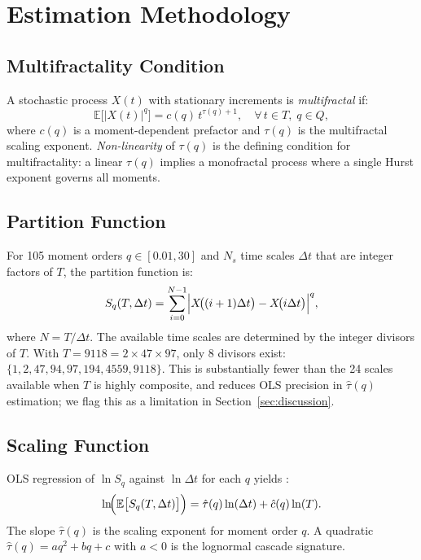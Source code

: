 \documentclass[12pt,a4paper]{article}
\begin{document}
\section{Estimation Methodology}

\subsection{Multifractality Condition}

A stochastic process $X(t)$ with stationary increments is
\emph{multifractal} if:
\begin{equation}
  \mathbb{E}\bigl[|X(t)|^q\bigr] = c(q)\,t^{\tau(q)+1},
  \quad \forall\, t \in T,\; q \in Q,
  \label{eq:multifractal-def}
\end{equation}
where $c(q)$ is a moment-dependent prefactor and $\tau(q)$ is the
multifractal scaling exponent. \emph{Non-linearity} of $\tau(q)$ is
the defining condition for multifractality: a linear $\tau(q)$ implies
a monofractal process where a single Hurst exponent governs all moments.

\subsection{Partition Function}

For 105 moment orders $q \in [0.01, 30]$ and $N_s$ time scales
$\Delta t$ that are integer factors of $T$, the partition function is:
\begin{equation}
  S_q(T,\Delta t) = \sum_{i=0}^{N-1}
  \Bigl|X\!\bigl((i+1)\Delta t\bigr) - X\!\bigl(i\Delta t\bigr)\Bigr|^q,
  \label{eq:partition}
\end{equation}
where $N = T/\Delta t$. The available time scales are determined by
the integer divisors of $T$. With $T = 9118 = 2 \times 47 \times 97$,
only 8 divisors exist: $\{1, 2, 47, 94, 97, 194, 4559, 9118\}$. This
is substantially fewer than the 24 scales available when $T$ is highly
composite, and reduces OLS precision in $\hat{\tau}(q)$ estimation;
we flag this as a limitation in Section~\ref{sec:discussion}.

\subsection{Scaling Function}

OLS regression of $\ln S_q$ against $\ln \Delta t$ for each $q$
yields \citep{calvet1997}:
\begin{equation}
  \ln\!\Bigl(\mathbb{E}\bigl[S_q(T,\Delta t)\bigr]\Bigr)
  = \hat{\tau}(q)\ln(\Delta t) + \hat{c}(q)\ln(T).
  \label{eq:ols-tau}
\end{equation}
The slope $\hat{\tau}(q)$ is the scaling exponent for moment order $q$.
A quadratic $\hat{\tau}(q) = aq^2 + bq + c$ with $a < 0$ is the
lognormal cascade signature.
\end{document}
